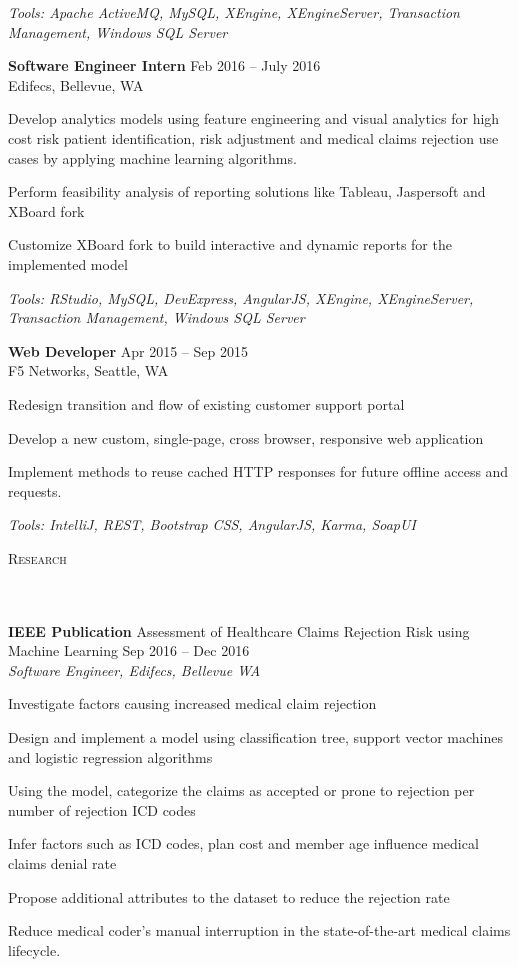 \documentclass{article}
\newcommand{\header}[1]{{
\hspace*{-15pt}\vspace*{6pt} \textsc{#1}} \vspace*{-6pt} 
\lineunder
}
\newcommand{\lineunder}{
\vspace*{-8pt} \\ \hspace*{-18pt} 
\hrulefill \\
}
\newcommand{\employer}[4]{{
\vspace*{2pt}%
\textbf{#1} #2 \hfill #3\\ #4 \vspace*{2pt}}
}
\newcommand{\project}[4]{{
\vspace*{2pt}%
\textbf{#1} #2 \hfill #3\\ \textit{#4} \vspace*{2pt}}
}
\renewcommand{\labelitemii}{
$\vcenter{\hbox{\tiny$\bullet$}}$\hspace*{-3pt}
}
\newenvironment{bullet-list-minor}{
\begin{list}{\labelitemii}{\setlength\leftmargin{15pt} 
\topsep 0pt \itemsep -2pt}}{\vspace*{4pt}\end{list}
}
\begin{document}
{\begin{bullet-list-minor}
	\textit{Tools: Apache ActiveMQ, MySQL, XEngine, XEngineServer, Transaction Management, Windows SQL Server}
  \end{bullet-list-minor}
	
  \employer{Software Engineer Intern}{}{Feb 2016 -- July 2016}{Edifecs, Bellevue, WA}
	\begin{bullet-list-minor}
	\item Develop analytics models using feature engineering and visual analytics for high cost risk patient identification, risk adjustment and medical claims rejection use cases by applying machine learning algorithms. 
	\item Perform feasibility analysis of reporting solutions like Tableau, Jaspersoft and XBoard fork 
	\item Customize XBoard fork to build interactive and dynamic reports for the implemented model
	
	\textit{Tools: RStudio, MySQL, DevExpress, AngularJS, XEngine, XEngineServer, Transaction Management, Windows SQL Server}

    \end{bullet-list-minor}
    
    \employer{Web Developer}{}{Apr 2015 -- Sep 2015}{F5 Networks, Seattle, WA}
	\begin{bullet-list-minor}
	\item Redesign transition and flow of existing customer support portal
	\item Develop a new custom, single-page, cross browser, responsive web application 
	\item Implement methods to reuse cached HTTP responses for future offline access and requests.
	
	\textit{Tools: IntelliJ, REST, Bootstrap CSS, AngularJS, Karma, SoapUI}
	\end{bullet-list-minor}
\vspace*{4pt}%



\header{Research}
    \project{IEEE Publication}{Assessment of Healthcare Claims Rejection Risk using Machine Learning}{Sep 2016 -- Dec 2016 }{Software Engineer, Edifecs, Bellevue WA}
	\begin{bullet-list-minor}
	\item Investigate factors causing increased medical claim rejection
	\item Design and implement a model using classification tree, support vector machines and logistic regression algorithms
	\item Using the model, categorize the claims as accepted or prone to rejection per number of rejection ICD codes
	\item Infer factors such as ICD codes, plan cost and member age influence medical claims denial rate
   	\item Propose additional attributes to the dataset to reduce the rejection rate
	\item Reduce medical coder’s manual interruption in the state-of-the-art medical claims lifecycle. 
	

\end{bullet-list-minor}}
\end{document}
